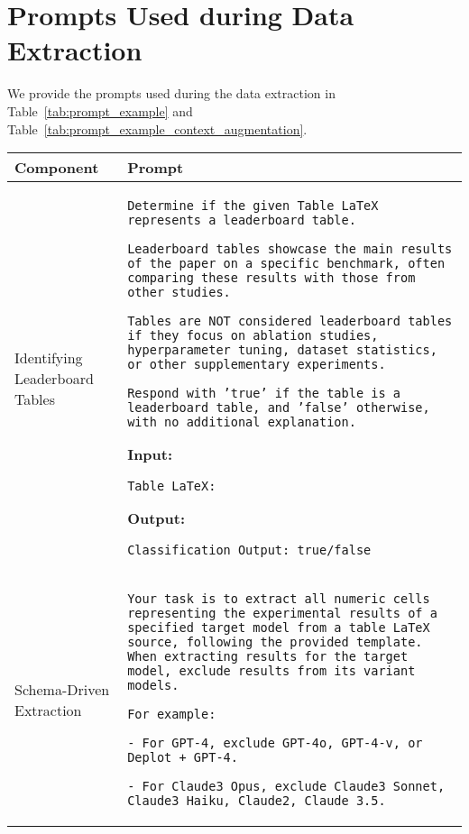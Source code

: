 \section{Prompts Used during Data Extraction}
\label{appendix:prompt_examples}

We provide the prompts used during the data extraction in Table~\ref{tab:prompt_example} and Table~\ref{tab:prompt_example_context_augmentation}.



\begin{table*}[ht]  
    \centering  
    \small
    \renewcommand{\arraystretch}{1.3} 
    \begin{tabular}{p{}|p{}}
    \toprule
    \textbf{Component} & \textbf{Prompt} \\ \midrule  
    Identifying Leaderboard Tables & \texttt {Determine if the given Table LaTeX represents a leaderboard table.}
    
\texttt {Leaderboard tables showcase the main results of the paper on a specific benchmark, often comparing these results with those from other studies.}

\texttt {Tables are NOT considered leaderboard tables if they focus on ablation studies, hyperparameter tuning, dataset statistics, or other supplementary experiments.}

\texttt {Respond with 'true' if the table is a leaderboard table, and 'false' otherwise, with no additional explanation.}

\textbf
{Input:}  

\texttt {Table LaTeX: }  

\textbf
{Output:}  

\texttt
{Classification Output: true/false}  \\ \hline

Schema-Driven Extraction & 

\texttt {Your task is to extract all numeric cells representing the experimental results of a specified target model from a table LaTeX source, following the provided template. When extracting results for the target model, exclude results from its variant models.} \newline

\texttt{For example:}

\texttt{- For GPT-4, exclude GPT-4o, GPT-4-v, or Deplot + GPT-4.}

\texttt{- For Claude3 Opus, exclude Claude3 Sonnet, Claude3 Haiku, Claude2, Claude 3.5.}


\end{tabular}
\end{table*}
